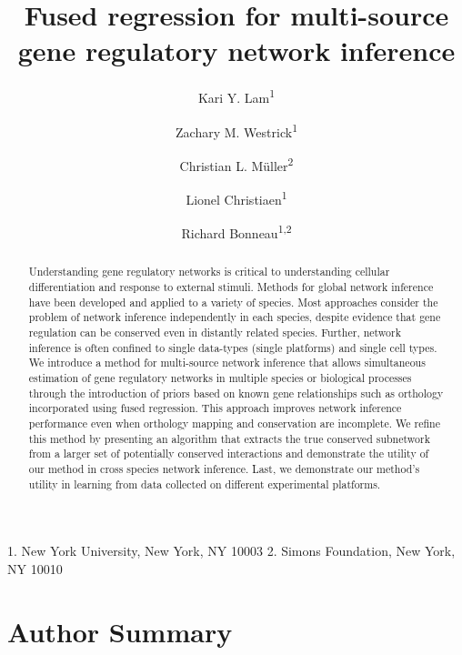 \documentclass[11pt]{article}
\begin{document}
\title{Fused regression for multi-source gene regulatory network inference}
\author{Kari Y. Lam\textsuperscript{1} \and Zachary M. Westrick\textsuperscript{1} \and Christian L. M\"{u}ller\textsuperscript{2}\and Lionel Christiaen\textsuperscript{1} \and Richard Bonneau\textsuperscript{1,2}}
\maketitle

  1. New York University, New York, NY 10003
  2. Simons Foundation, New York, NY 10010


\begin{abstract}
Understanding gene regulatory networks is critical to understanding cellular differentiation and response to external stimuli. Methods for global network inference have been developed and applied to a variety of species. 
Most approaches consider the problem of network inference independently in each species, despite evidence that gene regulation can be conserved even in distantly related species. 
Further, network inference is often confined to single data-types (single platforms) and single cell types. 
We introduce a method for multi-source network inference that allows simultaneous estimation of gene regulatory networks in multiple species or biological processes through the introduction of priors based on known gene relationships such as orthology incorporated using fused regression. 
This approach improves network inference performance even when orthology mapping and conservation are incomplete. 
We refine this method by presenting an algorithm that extracts the true conserved subnetwork from a larger set of potentially conserved interactions and demonstrate the utility of our method in cross species network inference. 
Last, we demonstrate our method's utility in learning from data collected on different experimental platforms.
\end{abstract}

\section{Author Summary}
\end{document}
